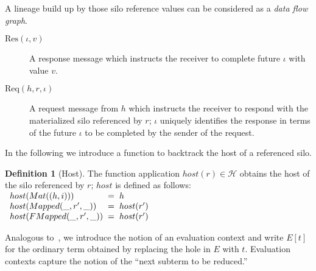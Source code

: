 \documentclass{article}
\theoremstyle{definition}
\newtheorem{defn}{Definition}[section]
\newcommand{\ba}{\begin{array}}
\newcommand{\ea}{\end{array}}
\newcommand{\Req}[3]{\text{Req}(#1, #2, #3)}
\newcommand{\Res}[2]{\text{Res}(#1, #2)}
\begin{document}
A lineage build up by those silo reference values can be considered as a {\emph{data flow graph}}\cite{???}. %

\begin{description}
\item[${\Res \iota v}$] A response message which instructs the receiver to complete future $\iota$ with value $v$. %

\item[${\Req h r \iota}$] A request message from $h$ which instructs the receiver to respond with the materialized silo referenced by $r$; $\iota$ uniquely identifies the response in terms of the future $\iota$ to be completed by the sender of the request.

\end{description}

In the following we introduce a function to backtrack the host of a referenced silo.

\begin{defn}[Host]\label{def:host}
  The function application $host(r) \in \mathcal{H}$ obtains the host of the silo referenced by $r$; $host$ is defined as follows: \\[1ex]
  $\ba[t]{l@{\hspace{2mm}}l@{\hspace{2mm}}l}
    host(Mat((h, i)))         & = & h \\
    host(Mapped(\_, r', \_))  & = & host(r') \\
    host(FMapped(\_, r', \_)) & = & host(r') \\
  \ea$
\end{defn}

Analogous to~\cite{TAPL}, we introduce the notion of an evaluation context and write $E[t]$ for the ordinary term obtained by replacing the hole in $E$ with $t$. Evaluation contexts capture the notion of the ``next subterm to be reduced.''
\end{document}
